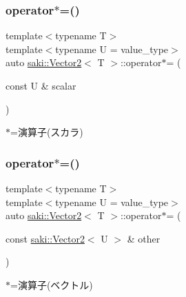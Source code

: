 \subsubsection{\texorpdfstring{operator$\ast$=()}{operator*=()}\hspace{0.1cm}{\footnotesize\ttfamily [1/2]}}
{\footnotesize\ttfamily template$<$typename T$>$ \\
template$<$typename U  = value\+\_\+type$>$ \\
auto \mbox{\hyperlink{classsaki_1_1_vector2}{saki\+::\+Vector2}}$<$ T $>$\+::operator$\ast$= (\begin{DoxyParamCaption}\item[{const U \&}]{scalar }\end{DoxyParamCaption})\hspace{0.3cm}{\ttfamily [inline]}}



$\ast$=演算子(スカラ) 

\mbox{\label{classsaki_1_1_vector2_af60d3a1c5bb11eff48377b7041d38d13}} 
\subsubsection{\texorpdfstring{operator$\ast$=()}{operator*=()}\hspace{0.1cm}{\footnotesize\ttfamily [2/2]}}
{\footnotesize\ttfamily template$<$typename T$>$ \\
template$<$typename U  = value\+\_\+type$>$ \\
auto \mbox{\hyperlink{classsaki_1_1_vector2}{saki\+::\+Vector2}}$<$ T $>$\+::operator$\ast$= (\begin{DoxyParamCaption}\item[{const \mbox{\hyperlink{classsaki_1_1_vector2}{saki\+::\+Vector2}}$<$ U $>$ \&}]{other }\end{DoxyParamCaption})\hspace{0.3cm}{\ttfamily [inline]}}



$\ast$=演算子(ベクトル) 

\mbox{\label{classsaki_1_1_vector2_ab1026aa5555d4b6e8e82331eeff32ec2}} 
